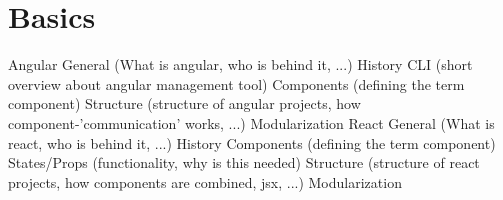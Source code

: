 \chapter{Basics}
\label{cha:Basics}

Angular
	General (What is angular, who is behind it, ...)
	History
	CLI (short overview about angular management tool)
	Components (defining the term component)
	Structure (structure of angular projects, how component-'communication' works, ...)
	Modularization
React
	General (What is react, who is behind it, ...)
	History 
	Components (defining the term component)
	States/Props (functionality, why is this needed)
	Structure (structure of react projects, how components are combined, jsx, ...)
	Modularization
